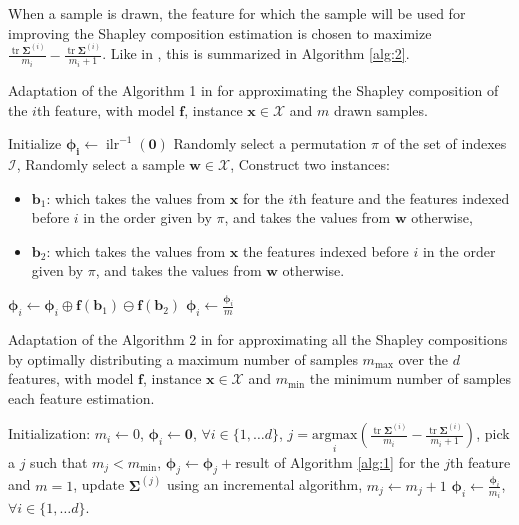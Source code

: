 \documentclass{article}
\theoremstyle{plain}
\theoremstyle{definition}
\theoremstyle{remark}
\DeclareMathOperator{\ilr}{ilr}
\DeclareMathOperator{\tr}{tr}
\begin{document}
When a sample is drawn, the feature for which the sample will be used for improving the Shapley composition estimation is chosen to maximize $\frac{\tr \bm{\Sigma}^{(i)}}{m_i} - \frac{\tr \bm{\Sigma}^{(i)}}{m_i+1}$. Like in \cite{vstrumbelj2014explaining}, this is summarized in Algorithm \ref{alg:2}.
\begin{algorithm}
   \caption{Adaptation of the Algorithm 1 in \cite{vstrumbelj2014explaining} for approximating the Shapley composition of the $i$th feature, with model $\bm{f}$, instance $\bm{x}\in\mathcal{X}$ and $m$ drawn samples.}
   \label{alg:1}
\begin{algorithmic}
   \STATE Initialize $\bm{\phi_i}\leftarrow \ilr^{-1}(\bm{0})$
   \STATE Randomly select a permutation $\pi$ of the set of indexes $\mathcal{I}$,
   \STATE Randomly select a sample $\bm{w}\in\mathcal{X}$,
   \STATE Construct two instances:
   \begin{itemize}
     \item $\bm{b}_1$: which takes the values from $\bm{x}$ for the $i$th feature and the features indexed before $i$ in the order given by $\pi$, and takes the values from $\bm{w}$ otherwise,
     \item $\bm{b}_2$: which takes the values from $\bm{x}$ the features indexed before $i$ in the order given by $\pi$, and takes the values from $\bm{w}$ otherwise.
     \end{itemize}
   \STATE $\bm{\phi}_i \leftarrow \bm{\phi}_i \oplus \bm{f}(\bm{b}_1) \ominus \bm{f}(\bm{b}_2) $
   \ENDFOR
   \STATE $\bm{\phi}_i \leftarrow \frac{\bm{\phi}_i}{m}$
\end{algorithmic}
\end{algorithm}

\begin{algorithm}
   \caption{Adaptation of the Algorithm 2 in \cite{vstrumbelj2014explaining} for approximating all the Shapley compositions by optimally distributing a maximum number of samples $m_{\text{max}}$ over the $d$ features, with model $\bm{f}$, instance $\bm{x}\in\mathcal{X}$ and $m_{\text{min}}$ the minimum number of samples each feature estimation.}
   \label{alg:2}
   \begin{algorithmic}
     \STATE Initialization: $m_{i} \leftarrow 0$, $\bm{\phi}_i \leftarrow \bm{0}$, $\forall i \in \{1, \dots d\}$,
     \STATE $j = \underset{i}{\text{argmax}} \left( \frac{\tr \bm{\Sigma}^{(i)}}{m_i} - \frac{\tr \bm{\Sigma}^{(i)}}{m_i+1} \right)$,
     \ELSE
     \STATE pick a $j$ such that $m_j < m_{\text{min}}$,
     \ENDIF
     \STATE $\bm{\phi}_j \leftarrow \bm{\phi}_j +$result of Algorithm \ref{alg:1} for the $j$th feature and $m=1$,
     \STATE update $\bm{\Sigma}^{(j)}$ using an incremental algorithm,
     \STATE $m_j \leftarrow m_j+1$
     \ENDWHILE
     \STATE $\bm{\phi}_i \leftarrow \frac{\bm{\phi}_i}{m_i}$, $\forall i \in \{1, \dots d\}$.
\end{algorithmic}
\end{algorithm}
\end{document}
